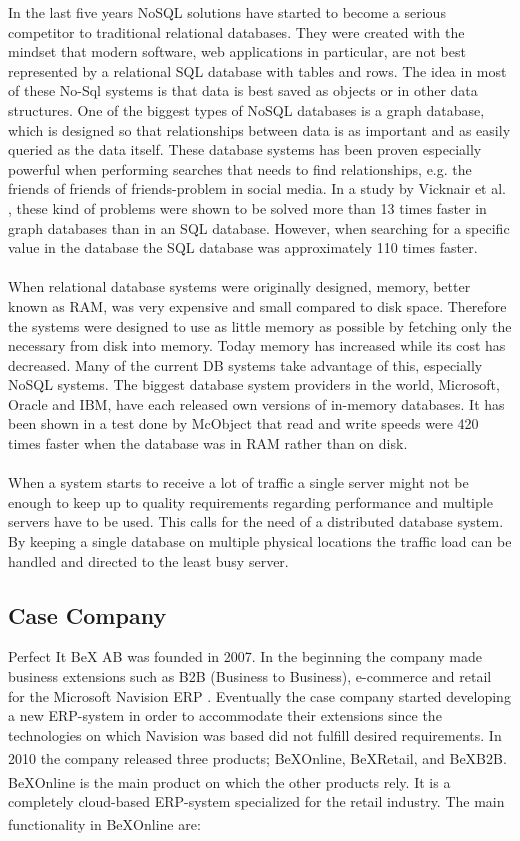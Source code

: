 \documentclass{cslthse-msc}
\newcommand{\bex}{BeX\textsuperscript{\textregistered}}
\begin{document}
In the last five years NoSQL solutions have started to become a serious competitor to traditional relational databases. They were created with the mindset that modern software, web applications in particular, are not best represented by a relational SQL database with tables and rows. The idea in most of these No-Sql systems is that data is best saved as objects or in other data structures. One of the biggest types of NoSQL databases is a graph database, which is designed so that relationships between data is as important and as easily queried as the data itself. These database systems has been proven especially powerful when performing searches that needs to find relationships, e.g. the friends of friends of friends-problem in social media. In a study by Vicknair et al. \cite{vicknair2010comparison}, these kind of problems were shown to be solved more than 13 times faster in graph databases than in an SQL database. However, when searching for a specific value in the database the SQL database was approximately 110 times faster.\\\\
When relational database systems were originally designed, memory, better known as RAM, was very expensive and small compared to disk space. Therefore the systems were designed to use as little memory as possible by fetching only the necessary from disk into memory. Today memory has increased while its cost has decreased. Many of the current DB systems take advantage of this, especially NoSQL systems. The biggest database system providers in the world, Microsoft, Oracle and IBM, have each released own versions of in-memory databases. It has been shown in a test done by McObject \cite{mcobject} that read and write speeds were 420 times faster when the database was in RAM rather than on disk.\\\\
When a system starts to receive a lot of traffic a single server might not be enough to keep up to quality requirements regarding performance and multiple servers have to be used. This calls for the need of a distributed database system. By keeping a single database on multiple physical locations the traffic load can be handled and directed to the least busy server.

\subsection{Case Company}
Perfect It BeX AB was founded in 2007. In the beginning the company made business extensions such as B2B (Business to Business), e-commerce and retail for the Microsoft Navision ERP \cite{Navision}. Eventually the case company started developing a new ERP-system in order to accommodate their extensions since the technologies on which Navision was based did not fulfill desired requirements. In 2010 the company released three products; \bex Online, \bex Retail, and \bex B2B. \bex Online is the main product on which the other products rely. It is a completely cloud-based ERP-system specialized for the retail industry. The main functionality in \bex Online are:
\end{document}
